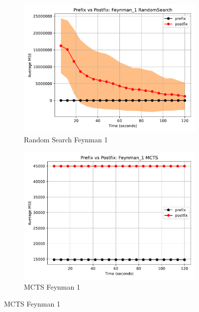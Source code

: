 \documentclass[runningheads]{llncs}
\begin{document}
\begin{figure}
    \centering
    
    \begin{subfigure}[b]{0.4\textwidth}
        \includegraphics[width=\linewidth, keepaspectratio]{AIFeynman_Benchmarks/PrePostFeynman_1RandomSearch.pdf}
        \caption{Random Search Feynman 1}
        \label{subfig:feynman_1_RS}
    \end{subfigure}
    \begin{subfigure}[b]{0.4\textwidth}
        \includegraphics[width=\linewidth, keepaspectratio]{AIFeynman_Benchmarks/PrePostFeynman_1MCTS.pdf}
        \caption{MCTS Feynman 1}
        \label{subfig:feynman_1_MCTS}
    \end{subfigure}
    

\end{figure}
\end{document}
